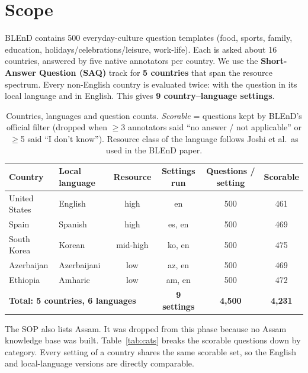\documentclass[11pt]{article}
\begin{document}
\section{Scope}
BLEnD contains 500 everyday-culture question templates (food, sports, family, education,
holidays/celebrations/leisure, work-life). Each is asked about 16 countries, answered by five native
annotators per country. We use the \textbf{Short-Answer Question (SAQ)} track for \textbf{5 countries}
that span the resource spectrum. Every non-English country is evaluated twice: with the question in
its local language and in English. This gives \textbf{9 country--language settings}.

\begin{table}[h]
\centering
\caption{Countries, languages and question counts. \emph{Scorable} = questions kept by BLEnD's
official filter (dropped when $\geq$3 annotators said ``no answer / not applicable'' or $\geq$5 said
``I don't know''). Resource class of the language follows Joshi et al.\ as used in the BLEnD paper.}
\label{tab:scope}
\begin{tabular}{llcccc}
\toprule
Country & Local language & Resource & Settings run & Questions / setting & Scorable \\
\midrule
United States & English     & high     & en          & 500 & 461 \\
Spain         & Spanish     & high     & es, en      & 500 & 469 \\
South Korea   & Korean      & mid-high & ko, en      & 500 & 475 \\
Azerbaijan    & Azerbaijani & low      & az, en      & 500 & 469 \\
Ethiopia      & Amharic     & low      & am, en      & 500 & 472 \\
\midrule
\multicolumn{3}{l}{\textbf{Total: 5 countries, 6 languages}} & \textbf{9 settings} & \textbf{4{,}500} & \textbf{4{,}231} \\
\bottomrule
\end{tabular}
\end{table}

The SOP also lists Assam. It was dropped from this phase because no Assam knowledge base was built.
Table~\ref{tab:cats} breaks the scorable questions down by category. Every setting of a country shares
the same scorable set, so the English and local-language versions are directly comparable.
\end{document}

